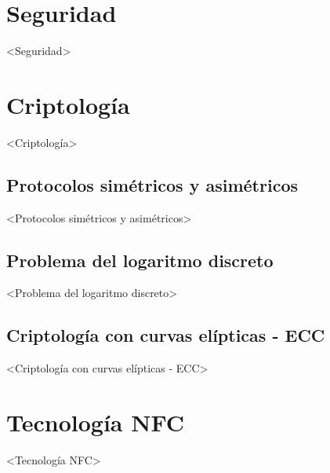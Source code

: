 \documentclass[../PFC.tex]{subfiles}
\begin{document}
\section{Seguridad}
\label{Seguridad}

<Seguridad>

\section{Criptología}
\label{Criptologia}

<Criptología>

\subsection{Protocolos simétricos y asimétricos}
\label{Protocolos simétricos y asimétricos}

<Protocolos simétricos y asimétricos>

\subsection{Problema del logaritmo discreto}
\label{Problema del logaritmo discreto}

<Problema del logaritmo discreto>

\subsection{Criptología con curvas elípticas - ECC}
\label{Seguridad}

<Criptología con curvas elípticas - ECC>

\section{Tecnología NFC}
\label{Tecnología NFC}

<Tecnología NFC>
\end{document}
